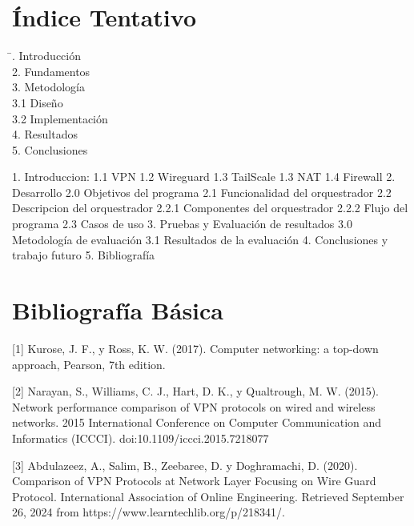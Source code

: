 \documentclass{article}
\begin{document}
\section{Índice Tentativo}
\begin{flushleft}
    \begin{tabbing}
    \hspace{4cm} \= . Introducción \>  \\
    2. Fundamentos \>  \\
    3. Metodología \>  \\
    \hspace{0.5cm}3.1 Diseño \>  \\
    \hspace{0.5cm}3.2 Implementación \>  \\
    4. Resultados \>  \\
    5. Conclusiones \>  \\
    \end{tabbing}
    \end{flushleft}
    

1. Introduccion:
    1.1 VPN
    1.2 Wireguard
    1.3 TailScale
    1.3 NAT
    1.4 Firewall
2. Desarrollo
    2.0 Objetivos del programa
    2.1 Funcionalidad del orquestrador
    2.2 Descripcion del orquestrador
    2.2.1 Componentes del orquestrador
    2.2.2 Flujo del programa
    2.3 Casos de uso
3. Pruebas y Evaluación de resultados 
    3.0 Metodología de evaluación
    3.1 Resultados de la evaluación
4. Conclusiones y trabajo futuro 
5. Bibliografía 

\section{Bibliografía Básica}
[1] Kurose, J. F., y Ross, K. W. (2017). Computer networking: a top-down approach,
Pearson, 7th edition.

[2] Narayan, S., Williams, C. J., Hart, D. K., y Qualtrough, M. W. (2015). Network performance comparison of VPN protocols on wired and wireless networks. 2015 International Conference on Computer Communication and Informatics (ICCCI). doi:10.1109/iccci.2015.7218077

[3]  Abdulazeez, A., Salim, B., Zeebaree, D. y Doghramachi, D. (2020). Comparison of VPN Protocols at Network Layer Focusing on Wire Guard Protocol. International Association of Online Engineering. Retrieved September 26, 2024 from https://www.learntechlib.org/p/218341/. 
\end{document}
